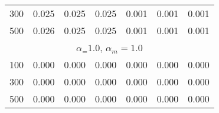 \begin{table}[!hbt]
\begin{tabular}{l|ccc|ccc}
		300                  & 0.025 & 0.025 & 0.025                & 0.001 & 0.001 & 0.001    \\
		500                  & 0.026 & 0.025 & 0.025                & 0.001 & 0.001 & 0.001    \\
		\hline
		\multicolumn{7}{c}{$\alpha_ = 1.0$, $\alpha_m = 1.0$}         \\
		\hline
		100                  & 0.000 & 0.000 & 0.000                & 0.000 & 0.000 & 0.000    \\
		300                  & 0.000 & 0.000 & 0.000                & 0.000 & 0.000 & 0.000    \\
		500                  & 0.000 & 0.000 & 0.000                & 0.000 & 0.000 & 0.000    \\
		\hline 
		\hline
	\end{tabular}
\end{table}

%
